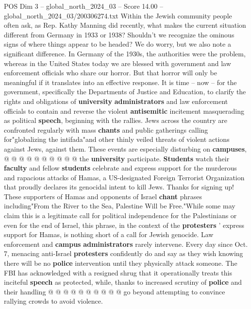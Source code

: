 \begin{textsample}{POS Dim 3 – global\_north\_2024\_03 – Score 14.00 – global\_north\_2024\_03/200306274.txt}  \label{ex:f3_pos_289}
Within the Jewish community people often ask, as Rep.
Kathy Manning did recently, what makes the current situation different from Germany in 1933 or 1938?
Shouldn't we recognize the ominous signs of where things appear to be headed?
We do worry, but we also note a significant difference.
In Germany of the 1930s, the authorities were the problem, whereas in the United States today we are blessed with government and law enforcement officials who share our horror.
But that horror will only be meaningful if it translates into an effective response.
It is time -- now -- for the government, specifically the Departments of Justice and Education, to clarify the rights and obligations of \textbf{university} \textbf{administrators} and law enforcement officials to contain and reverse the violent \textbf{antisemitic} incitement masquerading as political \textbf{speech}, beginning with the rallies.
Jews across the country are confronted regularly with mass \textbf{chants} and public gatherings calling for"globalizing the intifada"and other thinly veiled threats of violent actions against Jews, against them.
These events are especially disturbing on \textbf{campuses}, @ @ @ @ @ @ @ @ @ @ the \textbf{university} participate. \textbf{Students} watch their \textbf{faculty} and fellow \textbf{students} celebrate and express support for the murderous and rapacious attacks of Hamas, a US-designated Foreign Terrorist Organization that proudly declares its genocidal intent to kill Jews.
Thanks for signing up!
These supporters of Hamas and opponents of Israel \textbf{chant} phrases including"From the River to the Sea, Palestine Will be Free."While some may claim this is a legitimate call for political independence for the Palestinians or even for the end of Israel, this phrase, in the context of the \textbf{protesters} ' express support for Hamas, is nothing short of a call for Jewish genocide.
Law enforcement and \textbf{campus} \textbf{administrators} rarely intervene.
Every day since Oct. 7, menacing anti-Israel \textbf{protesters} confidently do and say as they wish knowing there will be no \textbf{police} intervention until they physically attack someone.
The FBI has acknowledged with a resigned shrug that it operationally treats this inciteful \textbf{speech} as protected, while, thanks to increased scrutiny of \textbf{police} and their handling @ @ @ @ @ @ @ @ @ @ go beyond attempting to convince rallying crowds to avoid violence.

\end{textsample}
